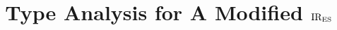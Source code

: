 \documentclass[10pt,conference]{IEEEtran}
\begin{document}
\title{Type Analysis for A Modified ${\text{IR}_\text{ES}}$}

\author{}
% 
% 

\maketitle





\end{document}
